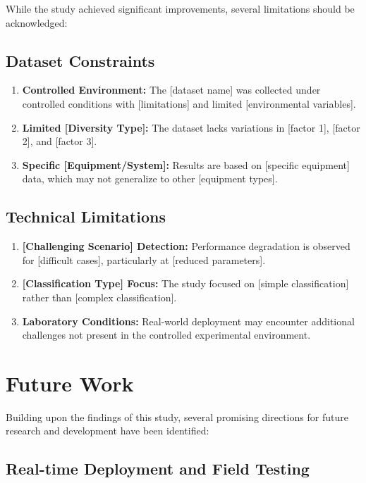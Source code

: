 While the study achieved significant improvements, several limitations should be acknowledged:

\subsection{Dataset Constraints}

\begin{enumerate}
\item \textbf{Controlled Environment:} The [dataset name] was collected under controlled conditions with [limitations] and limited [environmental variables].

\item \textbf{Limited [Diversity Type]:} The dataset lacks variations in [factor 1], [factor 2], and [factor 3].

\item \textbf{Specific [Equipment/System]:} Results are based on [specific equipment] data, which may not generalize to other [equipment types].
\end{enumerate}

\subsection{Technical Limitations}

\begin{enumerate}
\item \textbf{[Challenging Scenario] Detection:} Performance degradation is observed for [difficult cases], particularly at [reduced parameters].

\item \textbf{[Classification Type] Focus:} The study focused on [simple classification] rather than [complex classification].

\item \textbf{Laboratory Conditions:} Real-world deployment may encounter additional challenges not present in the controlled experimental environment.
\end{enumerate}

\section{Future Work}

Building upon the findings of this study, several promising directions for future research and development have been identified:

\subsection{Real-time Deployment and Field Testing}

